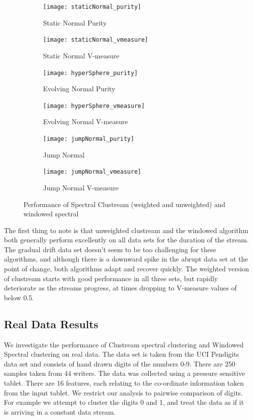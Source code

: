 \begin{figure}[h!]
\begin{subfigure}{.5\textwidth}
  \centering
  \texttt{[image: staticNormal\_purity]}
  \caption{Static Normal Purity}
\end{subfigure}%
\begin{subfigure}{.5\textwidth}
  \centering
  \texttt{[image: staticNormal\_vmeasure]}
  \caption{Static Normal V-measure}
\end{subfigure}
\begin{subfigure}{.5\textwidth}
  \centering
  \texttt{[image: hyperSphere\_purity]}
  \caption{Evolving Normal Purity}
\end{subfigure}%
\begin{subfigure}{.5\textwidth}
  \centering
  \texttt{[image: hyperSphere\_vmeasure]}
  \caption{Evolving Normal V-measure}
\end{subfigure}
\begin{subfigure}{.5\textwidth}
  \centering
  \texttt{[image: jumpNormal\_purity]}
  \caption{Jump Normal}
\end{subfigure}%
\begin{subfigure}{.5\textwidth}
  \centering
  \texttt{[image: jumpNormal\_vmeasure]}
  \caption{Jump Normal V-measure}
\end{subfigure}
\caption{Performance of Spectral Clustream (weighted and unweighted) and windowed spectral}
\label{fig:simulated_clustream}
\end{figure}

The first thing to note is that unweighted clustream and the windowed algorithm both generally perform excellently on all data sets for the duration of the stream. The gradual drift data set doesn't seem to be too challenging for these algorithms, and although there is a downward spike in the abrupt data set at the point of change, both algorithms  adapt and recover quickly. The weighted version of clustream starts with good performance in all three sets, but rapidly deteriorate as the streams progress, at times dropping to V-measure values of below 0.5.   

\subsection{Real Data Results}

We investigate the performance of Clustream spectral clustering and Windowed Spectral clustering on real data. The data set is taken from the UCI Pendigits data set and consists of hand drawn digits of the numbers 0-9. There are 250 samples taken from 44 writers. The data was collected using a pressure sensitive tablet. There are 16 features, each relating to the co-ordinate information taken from the input tablet. We restrict our analysis to pairwise comparison of digits. For example we attempt to cluster the digits 0 and 1, and treat the data as if it is arriving in a constant data stream. 

